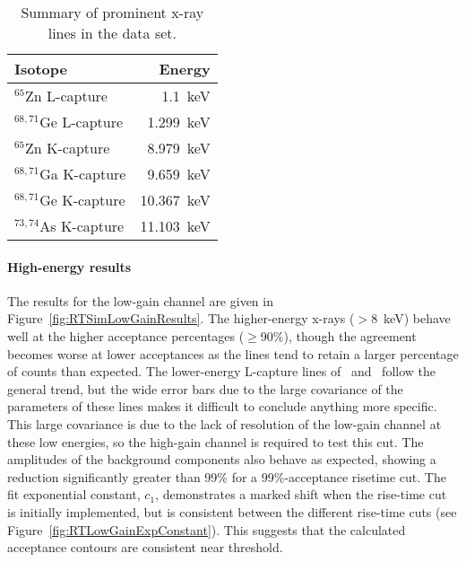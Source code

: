 					\begin{table}
					\centering
						\begin{tabular}{l r}
							\toprule
							Isotope & Energy \\
							\midrule
							$^{65}$Zn L-capture & 1.1~keV \\
							$^{68,71}$Ge L-capture & 1.299~keV \\
							$^{65}$Zn K-capture & 8.979~keV \\
							$^{68,71}$Ga K-capture & 9.659~keV \\
							$^{68,71}$Ge K-capture & 10.367~keV \\
							$^{73,74}$As K-capture & 11.103~keV \\
							\bottomrule
						\end{tabular}	
						\caption[Summary of prominent x-ray lines in the BeGe data set]
						{Summary of prominent x-ray lines in the data set.}
						\label{tab:XRayLines}
					\end{table}


					\paragraph{High-energy results}

The results for the low-gain channel are given in Figure~\ref{fig:RTSimLowGainResults}.  The higher-energy x-rays ($>8$~keV) behave well at the higher acceptance percentages ($\ge$90\%), though the agreement becomes worse at lower acceptances as the lines tend to retain a larger percentage of counts than expected.  The lower-energy L-capture lines of \gersixeight~and \znsixfive~follow the general trend, but the wide error bars due to the large covariance of the parameters of these lines makes it difficult to conclude anything more specific.  This large covariance is due to the lack of resolution of the low-gain channel at these low energies, so the high-gain channel is required to test this cut.  The amplitudes of the background components also behave as expected, showing a reduction significantly greater than 99\% for a 99\%-acceptance risetime cut.  The fit exponential constant, $c_{1}$, demonstrates a marked shift when the rise-time cut is initially implemented, but is consistent between the different rise-time cuts (see Figure~\ref{fig:RTLowGainExpConstant}).  This suggests that the calculated acceptance contours are consistent near threshold.  


